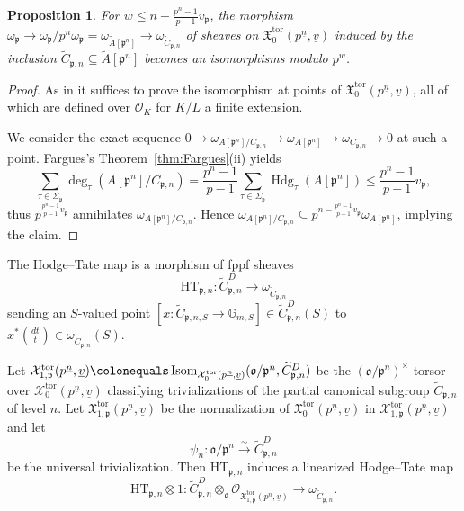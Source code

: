 \documentclass[11pt]{amsart}
\theoremstyle{definition} %
\theoremstyle{plain} %
\newtheorem{proposition}[definition]{Proposition}
\theoremstyle{remark} %
\newcommand{\GG}{{\mathbb G}}
\newcommand{\cO}{{\mathcal O}}
\newcommand{\cX}{{\mathcal X}}
\newcommand{\frakX}{\mathfrak X}
\newcommand{\frako}{\mathfrak o}
\newcommand{\frakp}{\mathfrak p}
\newcommand{\HT}{\mathrm{HT}}
\newcommand{\defeq}{\colonequals} %
\newcommand{\tor}{\mathrm{tor}} %
\DeclareMathOperator{\Hdg}{Hdg}
\DeclareMathOperator{\Isom}{Isom}
\begin{document}
\begin{proposition} \label{prop:omega_isom}
For $w\leqslant n-\frac{p^n-1}{p-1}v_\frakp$,
the morphism $\omega_{\frakp}  \rightarrow  \omega_{\frakp}/p^n\omega_{\frakp}
=\omega_{\widetilde{A}[\frakp^n]} \to  \omega_{\widetilde{C}_{\frakp,n}}$ of sheaves on $\frakX_0^\tor(p^{\underline{n}},\underline{v})$
induced by the inclusion $\widetilde{C}_{\frakp,n}\subseteq \widetilde{A}[\frakp^n]$
 becomes an isomorphisms modulo $p^w$.
\end{proposition}
\begin{proof}
As in \cite[Prop.~4.2.1]{AIP_Siegel} it suffices to prove the isomorphism at points of $\frakX_0^\tor(p^{\underline{n}},\underline{v})$,
all of which are defined over $\cO_K$ for $K/L$ a finite extension. 

We consider the  exact sequence  $0 \rightarrow \omega_{A[\frakp^n]/C_{\frakp,n}} \rightarrow \omega_{A[\frakp^n]} \rightarrow \omega_{C_{\frakp,n}}\rightarrow 0$ at such a point. Fargues's Theorem~\ref{thm:Fargues}(ii) yields 
\[
 \sum_{\tau\in\Sigma_\frakp} \deg_\tau (A[\frakp^n]/C_{\frakp,n}) = \frac{p^n-1}{p-1}\sum_{\tau\in \Sigma_\frakp}\Hdg_\tau(A[\frakp^n]) \leqslant \frac{p^n-1}{p-1}v_\frakp, 
\]
thus  $p^{\frac{p^n-1}{p-1}v_\frakp}$ annihilates $\omega_{A[\frakp^n]/C_{\frakp,n}}$. Hence 
$\omega_{A[\frakp^n]/C_{\frakp,n}}\subseteq p^{n-\frac{p^n-1}{p-1}v_\frakp}\omega_{A[\frakp^n]} $, implying the claim. 
\end{proof}

The Hodge--Tate map is a morphism of fppf sheaves
\[
\HT_{\frakp,n}\colon \widetilde{C}_{\frakp,n}^{D}\rightarrow \omega_{\widetilde{C}_{\frakp,n}}
\]
sending an $S$-valued point $[x\colon  \widetilde{C}_{\frakp,n,S} \rightarrow \GG_{m,S}]\in \widetilde{C}_{\frakp,n}^{D}(S)$ to $x^\ast (\frac{dt}{t})\in \omega_{\widetilde{C}_{\frakp,n}}(S)$.

Let $\cX_{1,\frakp}^\tor(p^{\underline{n}},\underline{v}) \defeq \Isom_{\cX_0^\tor(p^{\underline{n}},\underline{v})}(\frako/\frakp^n,\widetilde{C}_{\frakp,n}^{D})$ be the $(\frako/\frakp^n)^\times$-torsor over $\cX_0^\tor(p^{\underline{n}},\underline{v})$ classifying trivializations of the partial canonical subgroup $\widetilde{C}_{\frakp,n}$ of level $n$.
Let  $\frakX_{1,\frakp}^\tor(p^{\underline{n}},\underline{v})$ be the normalization of $\frakX_0^\tor(p^{\underline{n}},\underline{v})$ in $\cX_{1,\frakp}^\tor(p^{\underline{n}},\underline{v})$ and let  
\[\psi_n\colon \frako/\frakp^n \xrightarrow{\sim} \widetilde{C}_{\frakp,n}^{D}\] 
be the universal trivialization. Then  $\HT_{\frakp,n}$ induces a linearized Hodge--Tate map
\[
    \HT_{\frakp,n}\otimes 1 \colon \widetilde{C}_{\frakp,n}^{D}\otimes_{\frako} \cO_{\frakX_{1,\frakp}^\tor(p^{\underline{n}},\underline{v})} \rightarrow \omega_{\widetilde{C}_{\frakp,n}}.
\]
\end{document}
